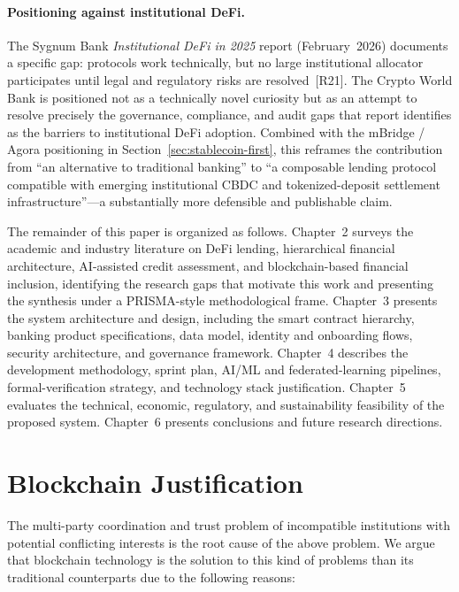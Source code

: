 \documentclass[12pt,a4paper]{report}
\begin{document}
\paragraph{Positioning against institutional DeFi.}
The Sygnum Bank \textit{Institutional DeFi in 2025} report (February~2026) documents a specific gap: protocols work technically, but no large institutional allocator participates until legal and regulatory risks are resolved~[R21]. The Crypto World Bank is positioned not as a technically novel curiosity but as an attempt to resolve precisely the governance, compliance, and audit gaps that report identifies as the barriers to institutional DeFi adoption. Combined with the mBridge / Agora positioning in Section~\ref{sec:stablecoin-first}, this reframes the contribution from ``an alternative to traditional banking'' to ``a composable lending protocol compatible with emerging institutional CBDC and tokenized-deposit settlement infrastructure''---a substantially more defensible and publishable claim.

The remainder of this paper is organized as follows. Chapter~2 surveys the academic and industry literature on DeFi lending, hierarchical financial architecture, AI-assisted credit assessment, and blockchain-based financial inclusion, identifying the research gaps that motivate this work and presenting the synthesis under a PRISMA-style methodological frame. Chapter~3 presents the system architecture and design, including the smart contract hierarchy, banking product specifications, data model, identity and onboarding flows, security architecture, and governance framework. Chapter~4 describes the development methodology, sprint plan, AI/ML and federated-learning pipelines, formal-verification strategy, and technology stack justification. Chapter~5 evaluates the technical, economic, regulatory, and sustainability feasibility of the proposed system. Chapter~6 presents conclusions and future research directions.

\section{Blockchain Justification}

The multi-party coordination and trust problem of incompatible institutions with potential conflicting interests is the root cause of the above problem. We argue that blockchain technology is the solution to this kind of problems than its traditional counterparts due to the following reasons:
\end{document}
